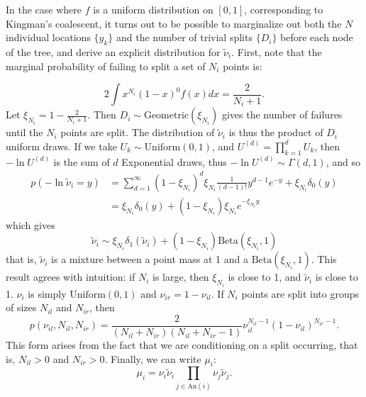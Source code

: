 \documentclass{bioinfo}
\newcommand{\nut}{\tilde{\nu}}
\newcommand{\Beta}{\mathrm{Beta} }
\newcommand{\ancestors}{\mathrm{An} }
\newcommand{\Uniform}{\mathrm{Uniform} }
\newcommand{\Geometric}{\mathrm{Geometric}}
\begin{document}
\begin{methods}
In the case where $f$ is a uniform distribution on $[0,1]$, corresponding to Kingman's coalescent, it turns out to be possible to marginalize out both the $N$ individual locations $\{y_k\}$ and the number of trivial splits $\{D_i\}$ before each node of the tree, and derive an explicit distribution for $\tilde{\nu}_i$.  First, note that the marginal probability of failing to split a set of $N_i$ points is:

\begin{equation}
2 \int x^{N_i} (1-x)^0 f(x) dx = \frac{2}{N_i+1}.
\end{equation} 
Let $\xi_{N_i} = 1-\frac{2}{N_i+1}$. Then $D_i \sim \Geometric(\xi_{N_i})$ gives the number of failures until the $N_i$ points are split.  The distribution of $\nut_i$ is thus the product of $D_i$ uniform draws.  If we take $U_k \sim \Uniform(0,1)$, and $U^{(d)} = \prod_{k=1}^d U_k $, then $-\ln U^{(d)}$ is the sum of $d$ Exponential draws, thus $- \ln U^{(d)} \sim \Gamma(d,1)$, and so
\begin{align}
p( -\ln \nut_i = y) 
&= \sum_{d=1}^\infty (1-\xi_{N_i})^d \xi_{N_i} \frac{1}{(d-1)!} y^{d-1} e^{-y} + \xi_{N_i} \delta_0(y)\\
&= \xi_{N_i}\delta_0(y) + (1-\xi_{N_i}) \xi_{N_i} e^{-\xi_{N_i} y} 
\end{align}
which gives
\begin{equation}
\nut_i \sim \xi_{N_i}\delta_1(\nut_i) + (1-\xi_{N_i}) \Beta(\xi_{N_i},1) \label{eq:nut} 
\end{equation}
that is, $\nut_i$ is a mixture between a point mass at 1 and a $\Beta(\xi_{N_i},1)$.  This result agrees with intuition: if $N_i$ is large, then $\xi_{N_i}$ is close to 1, and $\nut_i$ is close to 1.  $\nu_i$ is simply $\Uniform(0, 1)$ and $\nu_{ir} = 1 - \nu_{il}$.  If $N_i$ points are split into groups of sizes $N_{il}$ and $N_{ir}$, then 
\begin{equation}
p(\nu_{il},N_{il}, N_{ir}) = \frac{2}{(N_{il} + N_{ir})(N_{il} + N_{ir} -1)} \nu_{il}^{N_{il}-1} (1-\nu_{il})^{N_{ir}-1}.\label{eq:nu_N}
\end{equation}
This form arises from the fact that we are conditioning on a split occurring, that is, $N_{il}>0 $ and $N_{ir}>0$.  Finally, we can write $\mu_i$: 
\begin{equation}
\mu_i = \nu_i \nut_i \prod_{j \in \ancestors(i)} \nu_j\nut_j. \label{eq:mu_i}
\end{equation}


\end{methods}
\end{document}
